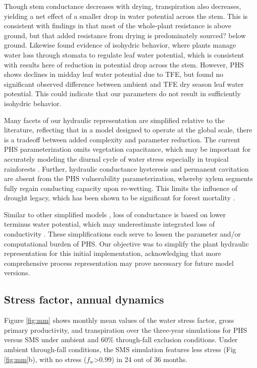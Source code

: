 \documentclass[draft,linenumbers]{agujournal}
\begin{document}
    Though stem conductance decreases with drying, transpiration also decreases, yielding a net effect of a smaller drop in water potential across the stem. This is consistent with findings in \cite{fisher2006} that most of the whole-plant resistance is above ground, but that added resistance from drying is predominately sourced? below ground. Likewise \cite{fisher2006} found evidence of isohydric behavior, where plants manage water loss through stomata to regulate leaf water potential, which is consistent with results here of reduction in potential drop across the stem. However, PHS shows declines in midday leaf water potential due to TFE, but \cite{fisher2006} found no significant observed difference between ambient and TFE dry season leaf water potential. This could indicate that our parameters do not result in sufficiently isohydric behavior.
    
    Many facets of our hydraulic representation are simplified relative to the literature, reflecting that in a model designed to operate at the global scale,  there is a tradeoff between added complexity and parameter reduction. The current PHS parameterization omits vegetation capacitance,  which may be important for accurately modeling the diurnal cycle of water stress especially in tropical rainforests \citep{meinzer2009}. Further, hydraulic conductance hysteresis and permanent cavitation are absent from the PHS vulnerability parameterization, whereby xylem segments fully regain conducting capacity upon re-wetting. This limits the influence of drought legacy, which has been shown to be significant for forest mortality \citep{anderegg2013}.
    
    Similar to other simplified models \citep{xu2016}, loss of conductance is based on lower terminus water potential, which may underestimate integrated loss of conductivity \citep{sperry2015}. These simplifications each serve to lessen the parameter and/or computational burden of PHS. Our objective was to simplify the plant hydraulic representation for this initial implementation, acknowledging that more comprehensive process representation may prove necessary for future model versions.

\subsection{Stress factor, annual dynamics}
    
    Figure \ref{fig:mm} shows monthly mean values of the water stress factor, gross primary productivity, and transpiration over the three-year simulations for PHS versus SMS under ambient and 60\% through-fall exclusion conditions. Under ambient through-fall conditions, the SMS simulation features less stress (Fig \ref{fig:mm}b), with no stress ($f_w$>0.99) in 24 out of 36 months.
    
\end{document}
